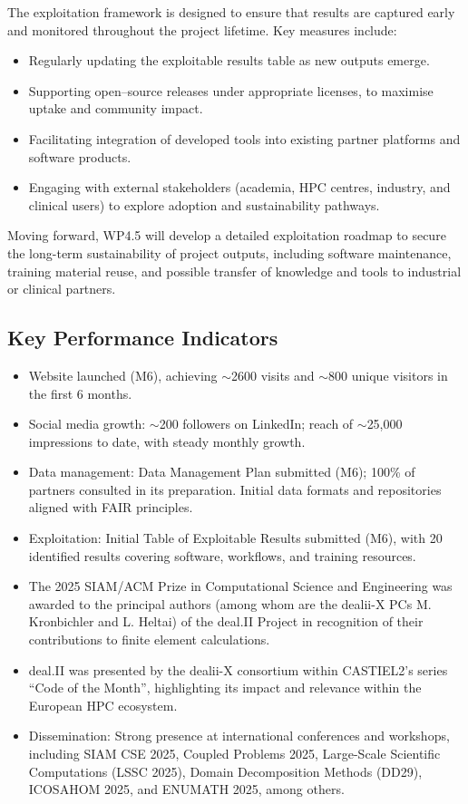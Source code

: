 \documentclass[a4paper,12pt, numbers]{article}
\begin{document}
The exploitation framework is designed to ensure that results are captured early and monitored throughout the project lifetime. Key measures include:  
\begin{itemize}[left=1em, itemsep=0pt, topsep=0pt]
\item Regularly updating the exploitable results table as new outputs emerge.  
\item Supporting open--source releases under appropriate licenses, to maximise uptake and community impact.  
\item Facilitating integration of developed tools into existing partner platforms and software products.  
\item Engaging with external stakeholders (academia, HPC centres, industry, and clinical users) to explore adoption and sustainability pathways.  
\end{itemize}

Moving forward, WP4.5 will develop a detailed exploitation roadmap to secure the long-term sustainability of project outputs, including software maintenance, training material reuse, and possible transfer of knowledge and tools to industrial or clinical partners.



\subsection{Key Performance Indicators} %
\begin{itemize}[left=1em, itemsep=0pt, topsep=0pt]
\item Website launched (M6), achieving $\sim$2600 visits and $\sim$800 unique visitors in the first 6 months.
\item Social media growth: $\sim$200 followers on LinkedIn; reach of $\sim$25,000 impressions to date, with steady monthly growth.
\item Data management: Data Management Plan submitted (M6); 100\% of partners consulted in its preparation. Initial data formats and repositories aligned with FAIR principles.
\item Exploitation: Initial Table of Exploitable Results submitted (M6), with 20 identified results covering software, workflows, and training resources.
\item The 2025 SIAM/ACM Prize in Computational Science and Engineering was awarded to the principal authors (among whom are the dealii-X PCs M. Kronbichler and L. Heltai) of the deal.II Project in recognition of their contributions to finite element calculations.
\item deal.II was presented by the dealii-X consortium within CASTIEL2's series ``Code of the Month'', highlighting its impact and relevance within the European HPC ecosystem. 
\item Dissemination: Strong presence at international conferences and workshops, including SIAM CSE 2025, Coupled Problems 2025, Large-Scale Scientific Computations (LSSC 2025), Domain Decomposition Methods (DD29), ICOSAHOM 2025, and ENUMATH 2025, among others.
\end{itemize}
\end{document}
